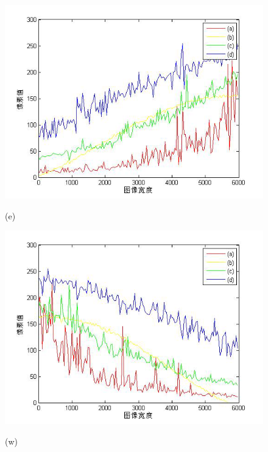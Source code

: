 \begin{figure}[htbp]

\begin{minipage}{0.48\linewidth}
\centerline{\includegraphics[width=1\linewidth]{figures/guangxianshuaijianduibituchuzhie.png}}
\centerline{(e)}
\end{minipage}
\begin{minipage}{0.48\linewidth}
\centerline{\includegraphics[width=1\linewidth]{figures/guangxianshuaijianduibituchuzhiw.png}}
\centerline{(w)}
\end{minipage}



\end{figure}
